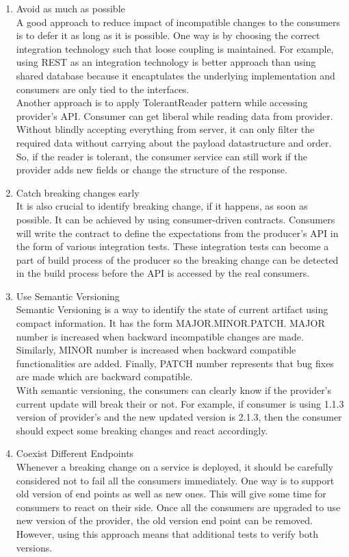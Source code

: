 \begin{enumerate}
\item Avoid as much as possible \\ A good approach to reduce impact of incompatible changes to the consumers is to defer it as long as it is possible. One way is by choosing the correct integration technology such that loose coupling is maintained. For example, using \acrshort{REST} as an integration technology is better approach than using shared database because it encaptulates the underlying implementation and consumers are only tied to the interfaces.\\
Another approach is to apply TolerantReader pattern while accessing provider's \acrshort{API}. \cite{Fowler:2011aa} Consumer can get liberal while reading data from provider. Without blindly accepting everything from server, it can only filter the required data without carrying about the payload datastructure and order. So, if the reader is tolerant, the consumer service can still work if the provider adds new fields or change the structure of the response.
\item Catch breaking changes early \\ It is also crucial to identify breaking change, if it happens, as soon as  possible. It can be achieved by using consumer-driven contracts. Consumers will write the contract to define the expectations from the producer's \acrshort{API} in the form of various integration tests. These integration tests can become a part of build process of the producer so the breaking change can be detected in the build process before the \acrshort{API} is accessed by the real consumers.
\item Use Semantic Versioning \\ Semantic Versioning is a way to identify the state of current artifact using compact information. It has the form MAJOR.MINOR.PATCH. MAJOR number is increased when backward incompatible changes are made. Similarly, MINOR number is increased when backward compatible functionalities are added. Finally, PATCH number represents that bug fixes are made which are backward compatible.\\
With semantic versioning, the consumers can clearly know if the provider's current update will break their  or not. For example, if consumer is using 1.1.3 version of provider's  and the new updated version is 2.1.3, then the consumer should expect some breaking changes and react accordingly.
\item Coexist Different Endpoints \\ Whenever a breaking change on a service is deployed, it should be carefully considered not to fail all the consumers immediately. One way is to support old version of end points as well as new ones. This will give some time for consumers to react on their side. Once all the consumers are upgraded to use new version of the provider, the old version end point can be removed. However, using this approach means that additional tests to verify both versions.

\end{enumerate}
